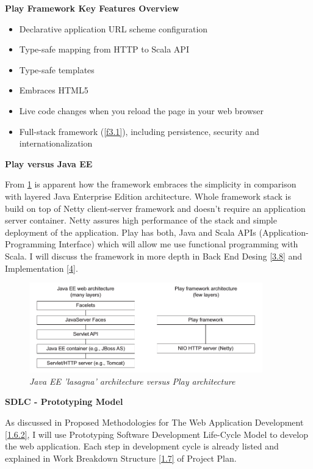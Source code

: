 \documentclass[12pt,twoside,a4paper]{report}
\begin{document}
\textbf{Play Framework Key Features Overview\cite{11}}

\begin{itemize}\itemsep1pt \parskip0pt 
\item Declarative application URL scheme configuration
\item Type-safe mapping from HTTP to Scala API
\item Type-safe templates
\item Embraces HTML5
\item Live code changes when you reload the page in your web browser
\item Full-stack framework (\cref{f3.1}), including persistence, security and internationalization
\end{itemize}

\textbf{Play versus Java EE}

From \cref{f3.2} is apparent how the framework embraces the simplicity in comparison with layered Java Enterprise Edition architecture. Whole framework stack is build on top of Netty\cite{19} client-server framework and doesn't require an application server container. Netty assures high performance of the stack and simple deployment of the application. Play has both, Java and Scala APIs (Application-Programming Interface) which will allow me use functional programming with Scala. I will discuss the framework in more depth in Back End Desing \cref{3.8} and Implementation \cref{4}.
\begin{figure}[!ht]
	\centering
		\includegraphics[width=0.9\textwidth, totalheight=8cm]{play_vs_java_ee}
	\caption{\textit{Java EE 'lasagna' architecture versus Play architecture}}
	\label{f3.2}
\end{figure}

\textbf{SDLC - Prototyping Model}\par
As discussed in Proposed Methodologies for The Web Application Development \cref{1.6.2}, I will use Prototyping Software Development Life-Cycle Model to develop the web application. Each step in development cycle is already listed and explained in Work Breakdown Structure \cref{1.7} of Project Plan.
\end{document}
